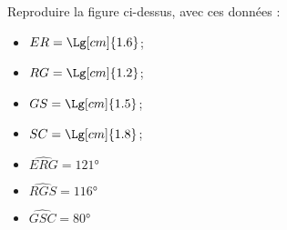 \begin{exercice*}
    Reproduire la figure ci-dessus, avec ces données :
    \begin{multicols}{2}
        \begin{itemize}
            \item $ER=\Lg[cm]{1.6}$;
            \item $RG=\Lg[cm]{1.2}$;
            \item $GS=\Lg[cm]{1.5}$;
            \item $SC=\Lg[cm]{1.8}$;
            \item $\widehat{ERG}=\ang{121}$
            \item $\widehat{RGS}=\ang{116}$
            \item $\widehat{GSC}=\ang{80}$
        \end{itemize}
    \end{multicols}
\end{exercice*}